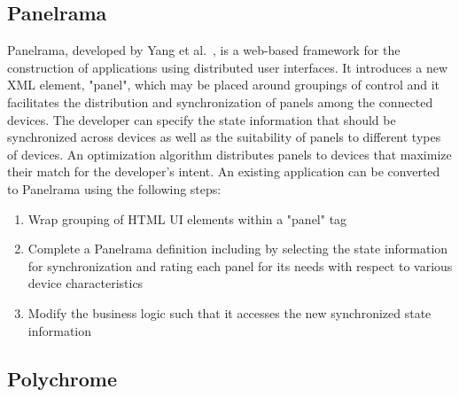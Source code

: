 \subsection{Panelrama}

Panelrama, developed by Yang et al.~\cite{panelrama2014}, is a web-based framework for the construction of applications using distributed user interfaces. It introduces a new XML element, "panel", which may be placed around groupings of control and it facilitates the distribution and synchronization of panels among the connected devices. The developer can specify the state information that should be synchronized across devices as well as the suitability of panels to different types of devices. An optimization algorithm distributes panels to devices that maximize their match for the developer's intent. An existing application can be converted to Panelrama using the following steps:
\begin{enumerate}
	\item Wrap grouping of HTML UI elements within a "panel" tag
	\item Complete a Panelrama definition including by selecting the state information for synchronization and rating each panel for its needs with respect to various device characteristics
	\item Modify the business logic such that it accesses the new synchronized state information
\end{enumerate}

\subsection{Polychrome}


